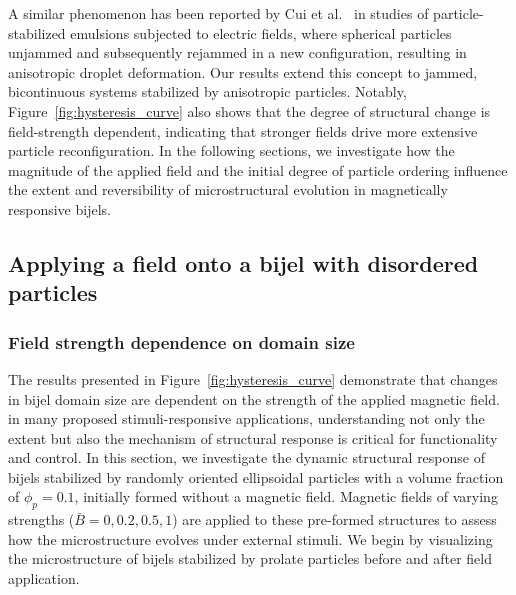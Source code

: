 A similar phenomenon has been reported by Cui et al.~\cite{cui_stabilizing_2013} in studies of particle-stabilized emulsions subjected to electric fields, 
where spherical particles unjammed and subsequently rejammed in a new configuration, resulting in anisotropic droplet deformation. Our results extend this 
concept to jammed, bicontinuous systems stabilized by anisotropic particles. Notably, Figure~\ref{fig:hysteresis_curve} also shows that the degree of 
structural change is field-strength dependent, indicating that stronger fields drive more extensive particle reconfiguration. In the following sections, 
we investigate how the magnitude of the applied field and the initial degree of particle ordering influence the extent and reversibility of microstructural 
evolution in magnetically responsive bijels.

\subsection{Applying a field onto a bijel with disordered particles}
\subsubsection{Field strength dependence on domain size}
\label{section:field-strength-dependence-on-domain-size}

The results presented in Figure~\ref{fig:hysteresis_curve} demonstrate that changes in bijel domain size are dependent on the strength of the applied magnetic 
field. in many proposed stimuli-responsive applications, understanding not only the extent but also the mechanism
of structural response is critical for functionality and control. In this section, we investigate the dynamic structural response of bijels stabilized by randomly 
oriented ellipsoidal particles with a volume fraction of \(\phi_p = 0.1\), initially formed without a magnetic field. Magnetic fields of varying strengths 
(\(\bar{B} = 0, 0.2, 0.5, 1\)) are applied to these pre-formed structures to assess how the microstructure evolves under external stimuli. We begin by visualizing 
the microstructure of bijels stabilized by prolate particles before and after field application.

